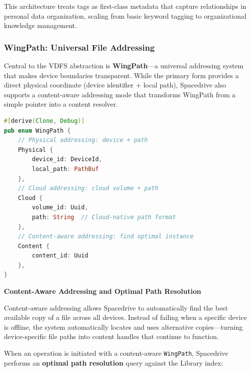 \documentclass[sigconf]{acmart}
\begin{document}
This architecture treats tags as first-class metadata that capture relationships in personal data organization, scaling from basic keyword tagging to organizational knowledge management.

\subsubsection{WingPath: Universal File Addressing}
Central to the VDFS abstraction is \textbf{WingPath}---a universal addressing system that makes device boundaries transparent. While the primary form provides a direct physical coordinate (device identifier + local path), Spacedrive also supports a content-aware addressing mode that transforms WingPath from a simple pointer into a content resolver.

\begin{lstlisting}[language=Rust, caption={WingPath supports both physical and content-aware addressing}]
#[derive(Clone, Debug)]
pub enum WingPath {
    // Physical addressing: device + path
    Physical {
        device_id: DeviceId,
        local_path: PathBuf
    },
    // Cloud addressing: cloud volume + path
    Cloud {
        volume_id: Uuid,
        path: String  // Cloud-native path format
    },
    // Content-aware addressing: find optimal instance
    Content {
        content_id: Uuid
    },
}
\end{lstlisting}

\textbf{Content-Aware Addressing and Optimal Path Resolution}

Content-aware addressing allows Spacedrive to automatically find the best available copy of a file across all devices. Instead of failing when a specific device is offline, the system automatically locates and uses alternative copies---turning device-specific file paths into content handles that continue to function.

When an operation is initiated with a content-aware \texttt{WingPath}, Spacedrive performs an \textbf{optimal path resolution} query against the Library index:
\end{document}
